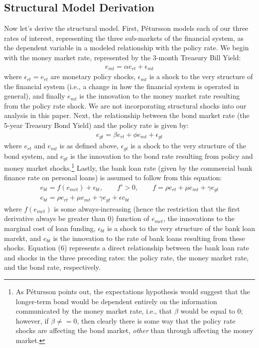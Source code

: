 \documentclass[12pt,final]{article}
\begin{document}
\subsection{Structural Model Derivation}
Now let's derive the structural model. First, Pétursson models each of our three rates of interest, representing the three sub-markets of the financial system, as the dependent variable in a modeled relationship with the policy rate. \citep{Petursson2001} We begin with the money market rate, represented by the 3-month Treasury Bill Yield:
\begin{gather}
	e_{mt} = \alpha e_{rt} + \epsilon_{mt}
\end{gather}
where $\epsilon_{rt} = e_{rt}$ are monetary policy shocks, $\epsilon_{mt}$ is a shock to the very structure of the financial system (i.e., a change in how the financial system is operated in general), and finally $e_{mt}$ is the innovation to the money market rate resulting from the policy rate shock. We are not incorporating structural shocks into our analysis in this paper. Next, the relationship between the bond market rate (the 5-year Treasury Bond Yield) and the policy rate is given by:
\begin{gather}
	e_{gt} = \beta e_{rt} + \phi e_{mt} + \epsilon_{gt}
\end{gather}
where $e_{rt}$ and $e_{mt}$ is as defined above, $\epsilon_{gt}$ is a shock to the very structure of the bond system, and $e_{gt}$ is the innovation to the bond rate resulting from policy and money market shocks.\footnote{As Pétursson points out, the expectations hypothesis would suggest that the longer-term bond would be dependent entirely on the information communicated by the money market rate, i.e., that $\beta$ would be equal to 0; however, if $\beta \neq = 0$, then clearly there is some way that the policy rate shocks are affecting the bond market, \textit{other} than through affecting the money market.} Lastly, the bank loan rate (given by the commercial bank finance rate on personal loans) is assumed to follow from this equation:
\begin{gather}
	e_{bt} = f(e_{mct}) + \epsilon_{bt}, \quad \quad f' > 0, \quad \quad f = \rho e_{rt} + \mu e_{mt} + \gamma e_{gt} \\
	e_{bt} = \rho e_{rt} + \mu e_{mt} + \gamma e_{gt} + \epsilon e_{bt}
\end{gather}
where $f(e_{mct})$ is some always-increasing (hence the restriction that the first derivative always be greater than 0) function of $e_{mct}$, the innovations to the marginal cost of loan funding, $\epsilon_{bt}$ is a shock to the very structure of the bank loan marekt, and $e_{bt}$ is the innovation to the rate of bank loans resulting from these shocks. Equation (6) represents a direct relationship between the bank loan rate and shocks in the three preceding rates: the policy rate, the money market rate, and the bond rate, respectively. 
\end{document}
